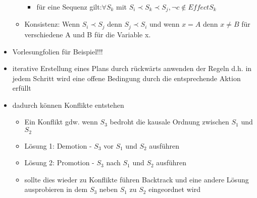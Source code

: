 \documentclass{article} %
\begin{document}
\begin{itemize}
\begin{itemize}
\begin{itemize}
				\item für eine Sequenz gilt:$\forall S_{k}$ mit $S_{i} \prec S_{k} \prec S_{j}, \neg c \notin Effect S_{k}$
			\end{itemize} 
			\item Konsistenz: Wenn $S_{i} \prec S_{j}$ denn $S_{j} \prec S_{i}$ und wenn $x=A$ denn $x \neq B$ für verschiedene A und B für die Variable x.
		\end{itemize}
		\item Vorlesungfolien für Beispiel!!!
		\item iterative Erstellung eines Plans durch rückwärts anwenden der Regeln d.h. in jedem Schritt wird eine offene Bedingung durch die entsprechende Aktion erfüllt
		\item dadurch können Konflikte entstehen
		\begin{itemize}
			\item Ein Konflikt gdw. wenn $S_{3}$ bedroht die kausale Ordnung zwischen $S_{1}$ und $S_{2}$
			\item Lösung 1: Demotion - $S_{3}$ vor $S_{1}$ und $S_{2}$ ausführen
			\item Lösung 2: Promotion - $S_{3}$ nach $S_{1}$ und $S_{2}$ ausführen
			\item sollte dies wieder zu Konflikte führen Backtrack und eine andere Lösung ausprobieren in dem $S_{3}$ neben $S_{1}$ zu $S_{2}$ eingeordnet wird
		\end{itemize}
	\end{itemize}
\end{document}
